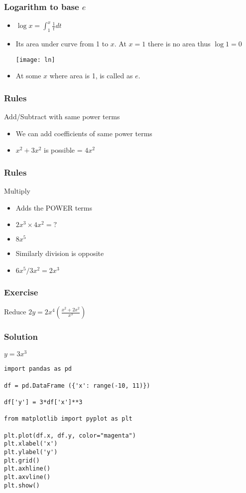  \begin{frame}[fragile]\frametitle{Logarithm to base $e$}
\begin{itemize}
\item $\log x = \int_1^x \frac{1}{t} dt$
\item Its area under curve from 1 to $x$. At $x=1$ there is no area thus $\log 1 = 0$
\begin{center}
\texttt{[image: ln]}
\end{center}
\item At some $x$ where area is 1, is called as $e$.
\end{itemize}
\end{frame}


 \begin{frame}[fragile]\frametitle{Rules}
Add/Subtract with same power terms
\begin{itemize}
\item We can add coefficients of same power terms
\item $x^2 + 3x^2$ is possible = $4x^2$
\end{itemize}
\end{frame}

 \begin{frame}[fragile]\frametitle{Rules}
Multiply
\begin{itemize}
\item Adds the POWER terms
\item $2x^3 \times 4x^2 = ?$
\item $8x^5$
\item Similarly division is opposite
\item $6x^5 / 3x^2 = 2x^3$
\end{itemize}
\end{frame}

 \begin{frame}[fragile]\frametitle{Exercise}
Reduce $2y = 2x^4 (\frac{x^2 + 2x^2}{x^3})$
\end{frame}
 \begin{frame}[fragile]\frametitle{Solution}
$y = 3x^3$

\begin{lstlisting}
import pandas as pd

df = pd.DataFrame ({'x': range(-10, 11)})

df['y'] = 3*df['x']**3

from matplotlib import pyplot as plt

plt.plot(df.x, df.y, color="magenta")
plt.xlabel('x')
plt.ylabel('y')
plt.grid()
plt.axhline()
plt.axvline()
plt.show()
\end{lstlisting}
\end{frame}

